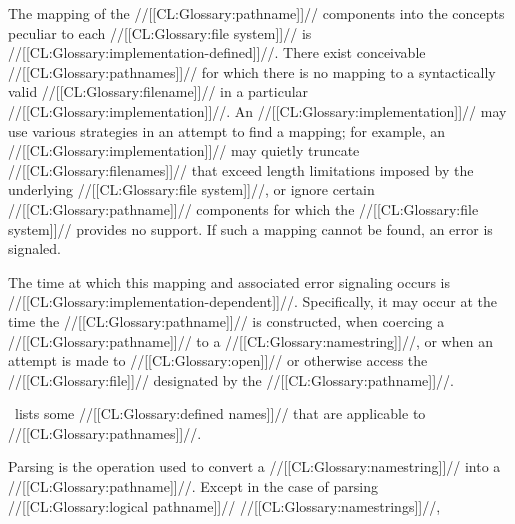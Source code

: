 %






The mapping of the //[[CL:Glossary:pathname]]// components into the concepts peculiar to
each //[[CL:Glossary:file system]]// is //[[CL:Glossary:implementation-defined]]//.
There exist conceivable //[[CL:Glossary:pathnames]]//
for which there is no mapping to a syntactically valid //[[CL:Glossary:filename]]//
in a particular //[[CL:Glossary:implementation]]//.
An //[[CL:Glossary:implementation]]// may use various strategies in an attempt to find a mapping;
for example, 
an //[[CL:Glossary:implementation]]// may quietly truncate //[[CL:Glossary:filenames]]//
that exceed length limitations imposed by the underlying //[[CL:Glossary:file system]]//,
or ignore certain //[[CL:Glossary:pathname]]// components
for which the //[[CL:Glossary:file system]]// provides no support.
If such a mapping cannot be found,
an error  is signaled.

The time at which this mapping and associated error signaling 
occurs is //[[CL:Glossary:implementation-dependent]]//.
Specifically, it may occur 
    at the time the //[[CL:Glossary:pathname]]// is constructed,
    when coercing a //[[CL:Glossary:pathname]]// to a //[[CL:Glossary:namestring]]//,
 or when an attempt is made to //[[CL:Glossary:open]]// or otherwise access the //[[CL:Glossary:file]]// 
     designated by the //[[CL:Glossary:pathname]]//.



\Thenextfigure\ lists some //[[CL:Glossary:defined names]]// that are applicable to //[[CL:Glossary:pathnames]]//.

\endSubsection%



Parsing is the operation used to convert a //[[CL:Glossary:namestring]]// into a //[[CL:Glossary:pathname]]//.
Except in the case of parsing //[[CL:Glossary:logical pathname]]// //[[CL:Glossary:namestrings]]//,

